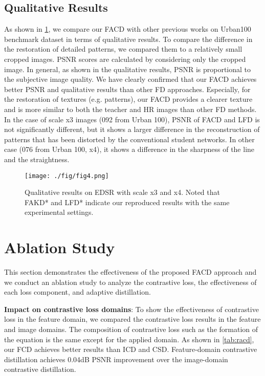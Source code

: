 \documentclass[10pt,twocolumn,letterpaper]{article}
\begin{document}
\subsection{Qualitative Results}
As shown in \cref{figure_3}, we compare our FACD with other previous works on Urban100 benchmark dataset in terms of qualitative results. To compare the difference in the restoration of detailed patterns, we compared them to a relatively small cropped images. PSNR scores are calculated by considering only the cropped image. In general, as shown in the qualitative results, PSNR is proportional to the subjective image quality. We have clearly confirmed that our FACD achieves better PSNR and qualitative results than other FD approaches. Especially, for the restoration of textures (e.g. patterns), our FACD provides a clearer texture and is more similar to both the teacher and HR images than other FD methods. In the case of scale x3 images (092 from Urban 100), PSNR of FACD and LFD is not significantly different, but it shows a larger difference in the reconstruction of patterns that has been distorted by the conventional student networks. In other case (076 from Urban 100, x4), it shows a difference in the sharpness of the line and the straightness.

\begin{figure}
\centering
\texttt{[image: ./fig/fig4.png]}
\caption{Qualitative results on EDSR with scale x3 and x4. Noted that FAKD* and LFD* indicate our reproduced results with the same experimental settings. \label{figure_3}}
\end{figure}

\section{Ablation Study} \label{abl}
This section demonstrates the effectiveness of the proposed FACD approach and we conduct an ablation study to analyze the contrastive loss, the effectiveness of each loss component, and adaptive distillation. 

\noindent \textbf{Impact on contrastive loss domains}: To show the effectiveness of contrastive loss in the feature domain, we compared the contrastive loss results in the feature and image domains. The composition of contrastive loss such as the formation of the equation is the same except for the applied domain. As shown in \cref{tab:racd}, our FCD achieves better results than ICD and CSD. Feature-domain contrastive distillation achieves 0.04dB PSNR improvement over the image-domain contrastive distillation. 
\end{document}
